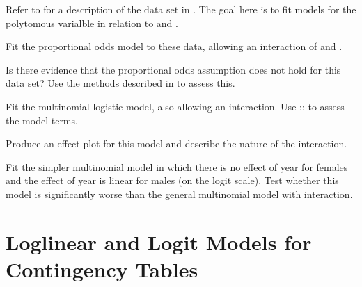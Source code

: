 \documentclass[10pt]{report}\usepackage[]{graphicx}\usepackage[]{color}
\begin{document}
\begin{Exercises}
\begin{enumerate*}
  \end{enumerate*}

\exercise\exhard\label{lab:logist-vietnam} Refer to  for a description of the  data set
  in . The goal here is to fit models for the polytomous  varialble in relation to 
  and .
  \begin{enumerate*}
    \item  Fit the proportional odds model to these data, allowing an interaction of  and .
    \begin{ans}
    \end{ans}
    
    \item Is there evidence that the proportional odds assumption does not hold for this data set? Use the methods
    described in  to assess this.
    \begin{ans}
    \end{ans}
    
    \item  Fit the multinomial logistic model, also allowing an interaction.  Use ::
    to assess the model terms.
    \begin{ans}
    \end{ans}
    
    \item Produce an effect plot for this model and describe the nature of the interaction.
    \begin{ans}
    \end{ans}
    
    \item Fit the simpler multinomial model in which there is no effect of year for females and the effect of
    year is linear for males (on the logit scale).  Test whether this model is significantly worse than the
    general multinomial model with interaction.
    \begin{ans}
    \end{ans}
    
  \end{enumerate*}
  

\end{Exercises}

\clearpage
\chapter{Loglinear and Logit Models for Contingency Tables}\label{ch:loglin}
\end{document}
